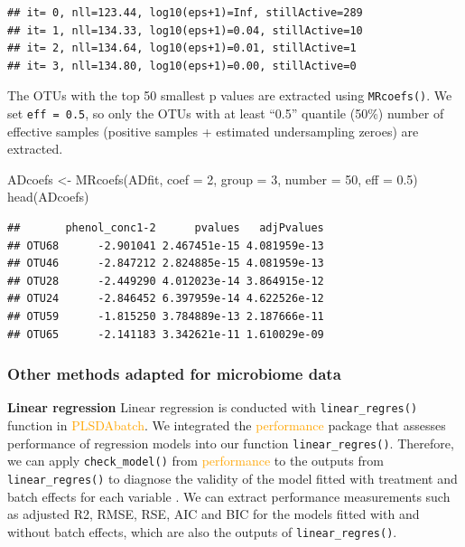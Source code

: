 \documentclass[
]{book}
\newenvironment{Shaded}{\begin{snugshade}}{\end{snugshade}}
\newcommand{\AttributeTok}[1]{\textcolor[rgb]{0.77,0.63,0.00}{#1}}
\newcommand{\DecValTok}[1]{\textcolor[rgb]{0.00,0.00,0.81}{#1}}
\newcommand{\FloatTok}[1]{\textcolor[rgb]{0.00,0.00,0.81}{#1}}
\newcommand{\FunctionTok}[1]{\textcolor[rgb]{0.00,0.00,0.00}{#1}}
\newcommand{\NormalTok}[1]{#1}
\newcommand{\OtherTok}[1]{\textcolor[rgb]{0.56,0.35,0.01}{#1}}
\begin{document}
\begin{verbatim}
## it= 0, nll=123.44, log10(eps+1)=Inf, stillActive=289
## it= 1, nll=134.33, log10(eps+1)=0.04, stillActive=10
## it= 2, nll=134.64, log10(eps+1)=0.01, stillActive=1
## it= 3, nll=134.80, log10(eps+1)=0.00, stillActive=0
\end{verbatim}

The OTUs with the top 50 smallest p values are extracted using \texttt{MRcoefs()}. We set \texttt{eff\ =\ 0.5}, so only the OTUs with at least ``0.5'' quantile (50\%) number of effective samples (positive samples + estimated undersampling zeroes) are extracted.

\begin{Shaded}
\begin{Highlighting}[]
\NormalTok{ADcoefs }\OtherTok{\textless{}{-}} \FunctionTok{MRcoefs}\NormalTok{(ADfit, }\AttributeTok{coef =} \DecValTok{2}\NormalTok{, }\AttributeTok{group =} \DecValTok{3}\NormalTok{, }\AttributeTok{number =} \DecValTok{50}\NormalTok{, }\AttributeTok{eff =} \FloatTok{0.5}\NormalTok{)}
\FunctionTok{head}\NormalTok{(ADcoefs)}
\end{Highlighting}
\end{Shaded}

\begin{verbatim}
##       phenol_conc1-2      pvalues   adjPvalues
## OTU68      -2.901041 2.467451e-15 4.081959e-13
## OTU46      -2.847212 2.824885e-15 4.081959e-13
## OTU28      -2.449290 4.012023e-14 3.864915e-12
## OTU24      -2.846452 6.397959e-14 4.622526e-12
## OTU59      -1.815250 3.784889e-13 2.187666e-11
## OTU65      -2.141183 3.342621e-11 1.610029e-09
\end{verbatim}

\hypertarget{other-methods-adapted-for-microbiome-data}{%
\subsubsection{Other methods adapted for microbiome data}\label{other-methods-adapted-for-microbiome-data}}

\textbf{Linear regression} Linear regression is conducted with \texttt{linear\_regres()} function in \textcolor{orange}{PLSDAbatch}. We integrated the \textcolor{orange}{performance} package that assesses performance of regression models into our function \texttt{linear\_regres()}. Therefore, we can apply \texttt{check\_model()} from \textcolor{orange}{performance} to the outputs from \texttt{linear\_regres()} to diagnose the validity of the model fitted with treatment and batch effects for each variable \citep{daniel2020performance}. We can extract performance measurements such as adjusted R2, RMSE, RSE, AIC and BIC for the models fitted with and without batch effects, which are also the outputs of \texttt{linear\_regres()}.
\end{document}
